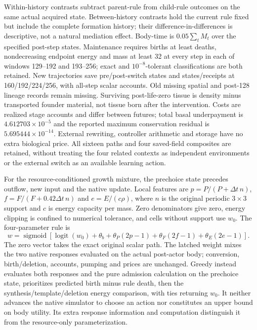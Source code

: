 Within-history contrasts subtract parent-rule from child-rule outcomes on the same actual acquired state. Between-history contrasts hold the current rule fixed but include the complete formation history; their difference-in-differences is descriptive, not a natural mediation effect. Body-time is $0.05\sum_t M_t$ over the specified post-step states. Maintenance requires births at least deaths, nondecreasing endpoint energy and mass at least 32 at every step in each of windows 129--192 and 193--256; exact and $10^{-8}$-tolerant classifications are both retained. New trajectories save pre/post-switch states and states/receipts at 160/192/224/256, with all-step scalar accounts. Old missing spatial and post-128 lineage records remain missing. Surviving post-life-zero tissue is density minus transported founder material, not tissue born after the intervention. Costs are realized stage accounts and differ between futures; total basal underpayment is $4.612703\times10^{-5}$ and the reported maximum conservation residual is $5.695444\times10^{-14}$. External rewriting, controller arithmetic and storage have no extra biological price. All sixteen paths and four saved-field composites are retained, without treating the four related contexts as independent environments or the external switch as an available learning action.

For the resource-conditioned growth mixture, the prechoice state precedes outflow, new input and the native update. Local features are $p=P/(P+\Delta t\,n)$, $f=F/(F+0.42\Delta t\,n)$ and $e=E/(c\rho)$, where $n$ is the original periodic $3\times3$ support and $c$ is energy capacity per mass. Zero denominators give zero, energy clipping is confined to numerical tolerance, and cells without support use $w_0$. The four-parameter rule is
\[
w=\operatorname{sigmoid}\!\left[\operatorname{logit}(w_0)+\theta_b+
\theta_P(2p-1)+\theta_F(2f-1)+\theta_E(2e-1)\right].
\]
The zero vector takes the exact original scalar path. The latched weight mixes the two native responses evaluated on the actual post-actor body; conversion, birth/deletion, accounts, pumping and prices are unchanged. Greedy instead evaluates both responses and the pure admission calculation on the prechoice state, prioritizes predicted birth minus rule death, then the synthesis/template/deletion energy comparison, with ties returning $w_0$. It neither advances the native simulator to choose an action nor constitutes an upper bound on body utility. Its extra response information and computation distinguish it from the resource-only parameterization.

